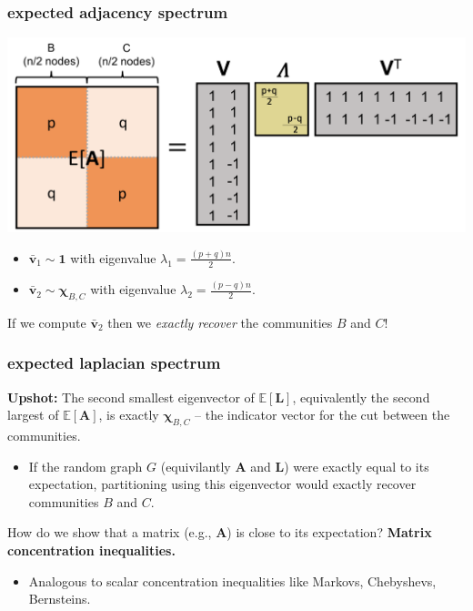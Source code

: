 \documentclass[compress]{beamer}
\newcommand{\bs}[1]{\boldsymbol{#1}}
\newcommand{\bv}[1]{\mathbf{#1}}
\newcommand{\R}{\mathbb{R}}
\newcommand{\E}{\mathbb{E}}
\begin{document}
\begin{frame}
	\frametitle{expected adjacency spectrum}
	\begin{center}
		\includegraphics[width=\textwidth]{Aeig_fix.png}
	\end{center}
	\begin{itemize}
		\item $\bar{\bv{v}}_1 \sim \bv{1}$ with eigenvalue $\lambda_1 = \frac{(p+q) n}{2}$.
		\item $\bar{\bv{v}}_2 \sim \bs{\chi}_{B,C}$ with eigenvalue $\lambda_2 = \frac{(p-q) n}{2}$.
	\end{itemize}
	If we compute $\bar{\bv{v}}_2$ then we \emph{exactly recover} the communities $B$ and $C$!
\end{frame}


\begin{frame}[t]
	\frametitle{expected laplacian spectrum}
	\textbf{Upshot:} The second smallest eigenvector of $\E[\bv{L}]$, equivalently the second largest of $\E[\bv{A}]$, is exactly $\bs{\chi}_{B,C}$ -- the indicator vector for the cut between the communities.
	\begin{itemize}
		\item If the random graph $G$ (equivilantly $\bv{A}$ and $\bv{L}$) were exactly equal to its expectation, partitioning using this eigenvector would exactly recover communities $B$ and $C$.
	\end{itemize}
	\alert{How do we show that a matrix (e.g., $\bv{A}$) is close  to its expectation?} \textbf{Matrix concentration inequalities.}
	\begin{itemize}
		\item Analogous to scalar concentration inequalities like Markovs, Chebyshevs, Bernsteins.
	\end{itemize}
\end{frame}
\end{document}
